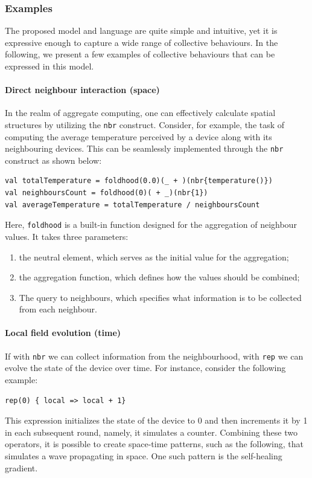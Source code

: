 \subsubsection{Examples}
\label{sec:field-calculus-foundational-behaviour}
The proposed model and language are quite simple and intuitive, 
 yet it is expressive enough to capture a wide range of collective behaviours.
In the following, we present a few examples of collective behaviours that can be expressed in this model.
\paragraph*{Direct neighbour interaction (space)}
In the realm of aggregate computing, 
 one can effectively calculate spatial structures by utilizing the \texttt{nbr} construct. 
 Consider, for example, the task of computing the average temperature perceived by a device along with its neighbouring devices. 
 This can be seamlessly implemented through the \texttt{nbr} construct as shown below:
\begin{lstlisting}[language=scafi]
val totalTemperature = foldhood(0.0)(_ + )(nbr{temperature()})
val neighboursCount = foldhood(0)( + _)(nbr{1})
val averageTemperature = totalTemperature / neighboursCount
\end{lstlisting}
Here, \texttt{foldhood} is a built-in function designed for the aggregation of neighbour values. 
It takes three parameters:
\begin{enumerate}
\item the neutral element, which serves as the initial value for the aggregation;
\item the aggregation function, which defines how the values should be combined;
\item The query to neighbours, which specifies what information is to be collected from each neighbour.
\end{enumerate} 
\paragraph*{Local field evolution (time)}
If with \texttt{nbr} we can collect information from the neighbourhood, 
 with \texttt{rep} we can evolve the state of the device over time. 
 For instance, consider the following example:
\begin{lstlisting}[language=scafi]
rep(0) { local => local + 1}
\end{lstlisting}
This expression initializes the state of the device to 0 and then increments it by 1 in each subsequent round, namely, it simulates a counter.
Combining these two operators, it is possible to create space-time patterns, 
 such as the following, that simulates a wave propagating in space.
 One such pattern is the self-healing gradient.
